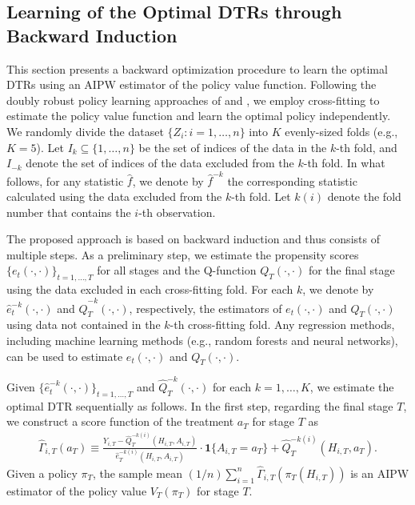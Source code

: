\subsection{Learning of the Optimal DTRs through Backward Induction}
\label{sec:learning_DTR}

This section presents a backward optimization procedure to learn the optimal DTRs using an AIPW estimator of the policy value function. Following the doubly robust policy learning approaches of \cite{Athey_Wager_2020} and \cite{zhou2022offline}, we employ cross-fitting to estimate the policy value function and learn the optimal policy independently. We randomly divide the dataset $\{Z_i:i=1,\ldots,n\}$ into $K$ evenly-sized folds (e.g., $K=5$). Let $I_k \subseteq \{1,\ldots,n\}$ be the set of indices of the data in the $k$-th fold, and $I_{-k}$ denote the set of indices of the data excluded from the $k$-th fold. In what follows, for any statistic $\hat{f}$, we denote by $\hat{f}^{-k}$ the corresponding statistic calculated using the data excluded from the $k$-th fold. Let $k(i)$ denote the fold number that contains the $i$-th observation.


The proposed approach is based on backward induction and thus consists of multiple steps. As a preliminary step, we estimate the propensity scores $\{e_t(\cdot,\cdot)\}_{t=1,\ldots,T}$ for all stages and the Q-function $Q_T(\cdot,\cdot)$ for the final stage using the data excluded in each cross-fitting fold. For each $k$, we denote by $\hat{e}_{t}^{-k}(\cdot,\cdot)$ and $\widehat{Q}_{T}^{-k}(\cdot,\cdot)$, respectively, the estimators of $e_t(\cdot,\cdot)$ and $Q_T(\cdot,\cdot)$ using data not contained in the $k$-th cross-fitting fold. Any regression methods, including machine learning methods (e.g., random forests and neural networks), can be used to estimate $e_t(\cdot,\cdot)$ and $Q_{T}(\cdot,\cdot)$. 

Given $\{\hat{e}_{t}^{-k}(\cdot,\cdot)\}_{t=1,\ldots,T}$ and  $\widehat{Q}_{T}^{-k}(\cdot,\cdot)$ for each $k=1,\ldots,K$, we estimate the optimal DTR sequentially as follows. In the first step, regarding the final stage $T$, we construct a score function of the treatment $a_T$ for stage $T$ as 
\begin{align}
    \widehat{\Gamma}_{i,T}(a_T) \equiv \frac{Y_{i,T} - \widehat{Q}_{T}^{-k(i)}(H_{i,T},A_{i,T})}{\hat{e}_{T}^{-k(i)}(H_{i,T},A_{i,T})}\cdot \mathbf{1}\{A_{i,T}=a_T\} +
    \widehat{Q}_{T}^{-k(i)}(H_{i,T},a_{T}). \label{eq:score_func_T}
\end{align}
Given a policy $\pi_T$, the sample mean $(1/n)\sum_{i=1}^{n}\widehat{\Gamma}_{i,T}(\pi_T(H_{i,T}))$ is an AIPW estimator of the policy value $V_{T}(\pi_{T})$ for stage $T$.

